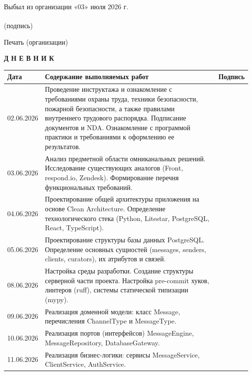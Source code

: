 \documentclass[12pt,a4paper]{report}
\begin{document}
Выбыл из организации «03» июля 2026 г. \\
\hrulefill \\
(подпись)

\vspace{1em}

Печать (организации)

\newpage
\thispagestyle{empty}

\begin{center}
\textbf{\Large Д Н Е В Н И К}
\end{center}

\vspace{1em}

\begin{tabularx}{\textwidth}{|p{2.2cm}|X|c|}
\hline
\textbf{Дата} & \textbf{Содержание выполняемых работ} & \textbf{Подпись} \\
\hline
02.06.2026 & Проведение инструктажа и ознакомление с требованиями охраны труда, техники безопасности, пожарной безопасности, а также правилами внутреннего трудового распорядка. Подписание документов и NDA. Ознакомление с программой практики и требованиями к оформлению ее результатов. & \\
\hline
03.06.2026 & Анализ предметной области омниканальных решений. Исследование существующих аналогов (Front, respond.io, Zendesk). Формирование перечня функциональных требований. & \\
\hline
04.06.2026 & Проектирование общей архитектуры приложения на основе Clean Architecture. Определение технологического стека (Python, Litestar, PostgreSQL, React, TypeScript). & \\
\hline
05.06.2026 & Проектирование структуры базы данных PostgreSQL. Определение основных сущностей (messages, senders, clients, curators), их атрибутов и связей. & \\
\hline
08.06.2026 & Настройка среды разработки. Создание структуры серверной части проекта. Настройка pre-commit хуков, линтеров (ruff), системы статической типизации (mypy). & \\
\hline
09.06.2026 & Реализация доменной модели: класс Message, перечисления ChannelType и MessageType. & \\
\hline
10.06.2026 & Реализация портов (интерфейсов) MessageEngine, MessageRepository, DatabaseGateway. & \\
\hline
11.06.2026 & Реализация бизнес-логики: сервисы MessageService, ClientService, AuthService. & \\

\end{tabularx}
\end{document}
